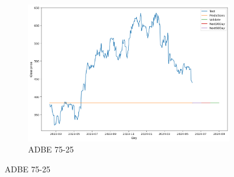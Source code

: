 \documentclass{ieeeojies}
\begin{document}
\begin{figure}[H]
\begin{subfigure}[h]{0.33\linewidth}
        \centering
        \includegraphics[width=\linewidth]{ARIMA Plot/ARIMA_ADBE_75_25.png}
        \caption{ADBE 75-25}
        \label{fig:adbe-75-25}
    \end{subfigure}
\end{figure}
 \vspace{-20pt}
\end{document}
